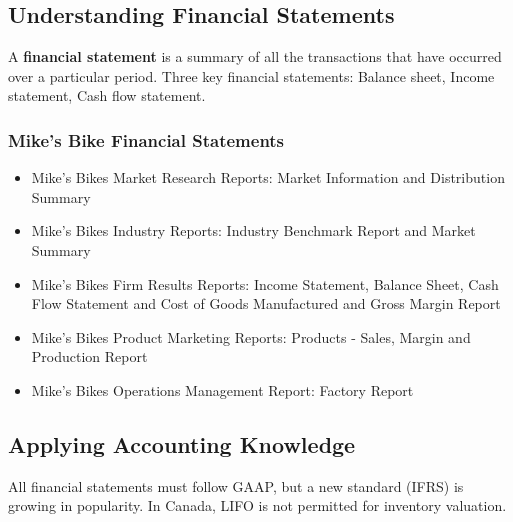 \documentclass[english, 12pt]{article}
\begin{document}
\subsection{Understanding Financial Statements}
\begin{defn}
A \textbf{financial statement} is a summary of all the transactions that have occurred over a particular period. Three key financial statements: Balance sheet, Income statement, Cash flow statement.
\end{defn}
\subsubsection*{Mike's Bike Financial Statements}
\begin{itemize}
\item Mike's Bikes Market Research Reports: Market Information and Distribution Summary
\item Mike's Bikes Industry Reports: Industry Benchmark Report and Market Summary
\item Mike's Bikes Firm Results Reports: Income Statement, Balance Sheet, Cash Flow Statement and Cost of Goods Manufactured and Gross Margin Report
\item Mike's Bikes Product Marketing Reports: Products - Sales, Margin and Production Report
\item Mike's Bikes Operations Management Report: Factory Report 
\end{itemize}
\subsection{Applying Accounting Knowledge}
All financial statements must follow GAAP, but a new standard (IFRS) is growing in popularity. In Canada, LIFO is not permitted for inventory valuation.
\end{document}
